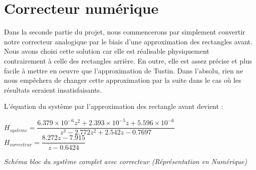 \documentclass[11pt, french]{article} %
\begin{document}
\section{Correcteur numérique}

Dans la seconde partie du projet, nous commencerons par simplement convertir notre correcteur analogique par le biais d'une approximation des rectangles avant. Nous avons choisi cette solution car elle est réalisable physiquement contrairement à celle des rectangles arrière. En outre, elle est assez précise et plus facile à mettre en oeuvre que l'approximation de Tustin. Dans l'absolu, rien ne nous empêchera de changer cette approximation par la suite dans le cas où les résultats seraient insatisfaisants. 

L'équation du système par l'approximation des rectangle avant devient :
\medskip


\begin{footnotesize}
\begin{center}
$ H_{syst\grave{e}me} = \dfrac{6.379 \times 10^{-6}z^{2} + 2.393 \times 10^{-5}z + 5.596 \times 10^{-6}} {z^{3} - 2.772z^{2} + 2.542z - 0.7697} $
\hspace{2cm}
$  H_{correcteur} = \dfrac {8.272z - 7.915} {z - 0.6424} $
\end{center}
\end{footnotesize}

\begin{center}

\emph{Schéma bloc du système complet avec correcteur (Réprésentation en Numérique)}
\end{center}
\end{document}
